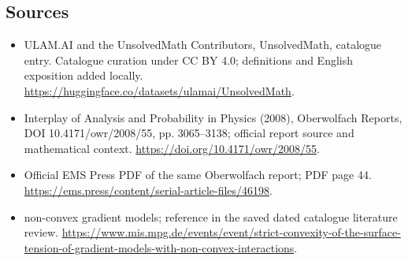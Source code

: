 \documentclass[11pt]{article}
\begin{document}
\subsection{Sources}
\begin{itemize}
\item[\hypertarget{source:statement:1}{S1}] ULAM.AI and the UnsolvedMath Contributors, UnsolvedMath, catalogue entry. Catalogue curation under CC BY 4.0; definitions and English exposition added locally.
\url{https://huggingface.co/datasets/ulamai/UnsolvedMath}.
\item[\hypertarget{source:statement:2}{S2}] Interplay of Analysis and Probability in Physics (2008), Oberwolfach Reports, DOI 10.4171/owr/2008/55, pp. 3065--3138; official report source and mathematical context.
\url{https://doi.org/10.4171/owr/2008/55}.
\item[\hypertarget{source:statement:3}{S3}] Official EMS Press PDF of the same Oberwolfach report; PDF page 44.
\url{https://ems.press/content/serial-article-files/46198}.
\item[\hypertarget{source:statement:4}{S4}] non-convex gradient models; reference in the saved dated catalogue literature review.
\url{https://www.mis.mpg.de/events/event/strict-convexity-of-the-surface-tension-of-gradient-models-with-non-convex-interactions}.
\end{itemize}
\label{end:statement}
\end{document}
